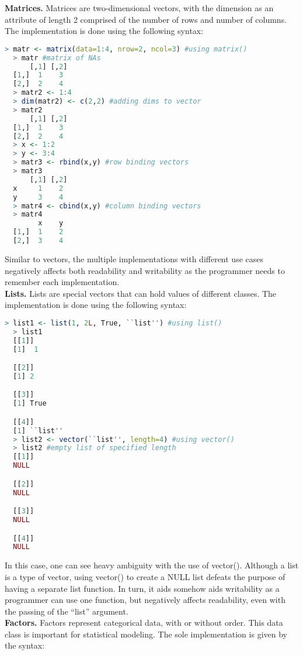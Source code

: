 \documentclass[12pt]{article}
\begin{document}
\textbf{Matrices.} Matrices are two-dimensional vectors, with the dimension as an attribute of length 2 comprised of the number of rows and number of columns. The implementation is done using the following syntax:

\begin{lstlisting}[language=R]
  > matr <- matrix(data=1:4, nrow=2, ncol=3) #using matrix()
  > matr #matrix of NAs
      [,1] [,2]
  [1,]  1    3
  [2,]  2    4
  > matr2 <- 1:4
  > dim(matr2) <- c(2,2) #adding dims to vector
  > matr2
      [,1] [,2]
  [1,]  1    3
  [2,]  2    4
  > x <- 1:2
  > y <- 3:4
  > matr3 <- rbind(x,y) #row binding vectors
  > matr3
      [,1] [,2]
  x     1    2
  y     3    4
  > matr4 <- cbind(x,y) #column binding vectors
  > matr4
        x    y
  [1,]  1    2
  [2,]  3    4
\end{lstlisting}

Similar to vectors, the multiple implementations with different use cases negatively affects both readability and writability as the programmer needs to remember each implementation.\\

\textbf{Lists.} Lists are special vectors that can hold values of different classes. The implementation is done using the following syntax:

\begin{lstlisting}[language=R]
  > list1 <- list(1, 2L, True, ``list'') #using list()
  > list1
  [[1]]
  [1]  1

  [[2]]
  [1] 2

  [[3]]
  [1] True

  [[4]]
  [1] ``list''
  > list2 <- vector(``list'', length=4) #using vector()
  > list2 #empty list of specified length
  [[1]]
  NULL

  [[2]]
  NULL

  [[3]]
  NULL

  [[4]]
  NULL
\end{lstlisting}

In this case, one can see heavy ambiguity with the use of vector(). Although a list is a type of vector, using vector() to create a NULL list defeats the purpose of having a separate list function. In turn, it aids somehow aids writability as a programmer can use one function, but negatively affects readability, even with the passing of the ``list'' argument.\\

\textbf{Factors.} Factors represent categorical data, with or without order. This data class is important for statistical modeling. The sole implementation is given by the syntax:
\end{document}
